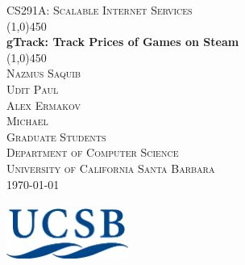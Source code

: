 \documentclass[12pt]{report}
\begin{document}
\begin{titlepage}
	\begin{center}
		\textsc{\normalsize{CS291A: Scalable Internet Services}}\\[0.5cm]
		\line(1,0){450}\\[0.25in]
		\huge{\bfseries gTrack: Track Prices of Games on Steam}\\[2mm]
		\line(1,0){450}\\[1.5cm]
		\textsc{\LARGE Nazmus Saquib}\\
		\textsc{\LARGE Udit Paul}\\
		\textsc{\LARGE Alex Ermakov}\\
		\textsc{\LARGE Michael}\\[0.75cm]
		\textsc{\large Graduate Students}\\[0.75cm]
		\textsc{\large Department of Computer Science}\\
		\textsc{\large University of California Santa Barbara}\\[0.75cm]
		\textsc{\large\today}\\[2.0cm]
		~\\[2.0cm]
		\includegraphics[width=0.3\textwidth]{ucsb-logo.png}
	\end{center}
\end{titlepage}

\tableofcontents
\newpage










\end{document}
